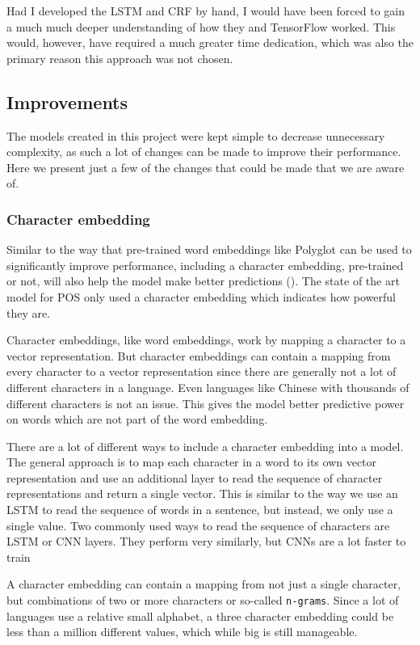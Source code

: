 Had I developed the LSTM and CRF by hand, I would have been forced to gain a
much much deeper understanding of how they and TensorFlow worked.
This would, however, have required a much greater time dedication, which was also
the primary reason this approach was not chosen.

\subsection{Improvements}

The models created in this project were kept simple to decrease unnecessary
complexity, as such a lot of changes can be made to improve their performance.
Here we present just a few of the changes that could be made that we are aware
of.

\subsubsection{Character embedding}

Similar to the way that pre-trained word embeddings like Polyglot can be used to
significantly improve performance, including a character embedding, pre-trained
or not, will also help the model make better predictions
(\cite{yang2018design}).  The state of the art model for POS only used a
character embedding which indicates how powerful they are.

Character embeddings, like word embeddings, work by mapping a character to a
vector representation. But character embeddings can contain a mapping from every
character to a vector representation since there are generally not a lot of
different characters in a language. Even languages like Chinese with thousands
of different characters is not an issue. This gives the model better predictive
power on words which are not part of the word embedding.

There are a lot of different ways to include a character embedding into a model.
The general approach is to map each character in a word to its own vector
representation and use an additional layer to read the sequence of character
representations and return a single vector. This is similar to the way we use an
LSTM to read the sequence of words in a sentence, but instead, we only use a
single value. Two commonly used ways to read the sequence of characters are LSTM
or CNN layers. They perform very similarly, but CNNs are a lot faster to
train~\cite{yang2018design}

A character embedding can contain a mapping from not just a single character,
but combinations of two or more characters or so-called \texttt{n-grams}. Since
a lot of languages use a relative small alphabet, a three character embedding
could be less than a million different values, which while big is still
manageable.


